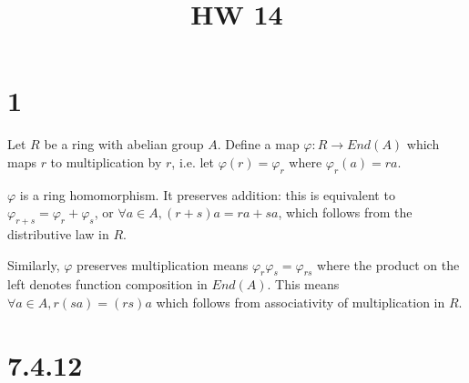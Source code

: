 \documentclass{article}
\title{HW 14}
\date{}
\def\vphi{\varphi}
\begin{document}
\maketitle

\section*{1}

Let $R$ be a ring with abelian group $A$. Define a map $\vphi : R \to End(A)$ which maps $r$ to multiplication by $r$, i.e. let $\vphi(r) = \vphi_r$ where $\vphi_r(a) = r a$.

$\vphi$ is a ring homomorphism. It preserves addition: this is equivalent to $\vphi_{r + s} = \vphi_{r} + \vphi_{s}$, or $\forall a \in A, (r+s)a = ra + sa$, which follows from the distributive law in $R$.

Similarly, $\vphi$ preserves multiplication means $\vphi_r \vphi_s = \vphi_{rs}$ where the product on the left denotes function composition in $End(A)$. This means $\forall a \in A, r(sa) = (rs)a$ which follows from associativity of multiplication in $R$.

\section*{7.4.12}
\end{document}
